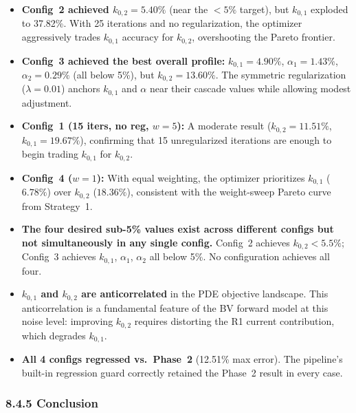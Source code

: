 \documentclass[11pt]{article}
\begin{document}
\begin{itemize}
  \item \textbf{Config~2 achieved $k_{0,2} = 5.40\%$} (near the $< 5\%$
        target), but $k_{0,1}$ exploded to 37.82\%.  With 25 iterations
        and no regularization, the optimizer aggressively trades $k_{0,1}$
        accuracy for $k_{0,2}$, overshooting the Pareto frontier.

  \item \textbf{Config~3 achieved the best overall profile:}
        $k_{0,1} = 4.90\%$, $\alpha_1 = 1.43\%$, $\alpha_2 = 0.29\%$
        (all below 5\%), but $k_{0,2} = 13.60\%$.  The symmetric
        regularization ($\lambda = 0.01$) anchors $k_{0,1}$ and $\alpha$
        near their cascade values while allowing modest adjustment.

  \item \textbf{Config~1 (15 iters, no reg, $w{=}5$):} A moderate result
        ($k_{0,2} = 11.51\%$, $k_{0,1} = 19.67\%$), confirming that 15
        unregularized iterations are enough to begin trading $k_{0,1}$
        for $k_{0,2}$.

  \item \textbf{Config~4 ($w{=}1$):} With equal weighting, the optimizer
        prioritizes $k_{0,1}$ ($6.78\%$) over $k_{0,2}$ ($18.36\%$),
        consistent with the weight-sweep Pareto curve from Strategy~1.

  \item \textbf{The four desired sub-5\% values exist across different
        configs but not simultaneously in any single config.}  Config~2
        achieves $k_{0,2} < 5.5\%$; Config~3 achieves $k_{0,1}$,
        $\alpha_1$, $\alpha_2$ all below 5\%.  No configuration achieves
        all four.

  \item \textbf{$k_{0,1}$ and $k_{0,2}$ are anticorrelated} in the PDE
        objective landscape.  This anticorrelation is a fundamental feature
        of the BV forward model at this noise level: improving $k_{0,2}$
        requires distorting the R1 current contribution, which degrades
        $k_{0,1}$.

  \item \textbf{All 4 configs regressed vs.\ Phase~2} (12.51\% max error).
        The pipeline's built-in regression guard correctly retained the
        Phase~2 result in every case.
\end{itemize}

\subsubsection*{8.4.5 Conclusion}
\end{document}
